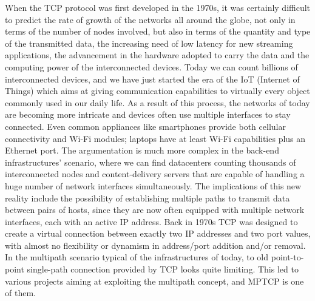 \vspace{5mm}
When the TCP protocol was first developed in the 1970s, it was certainly difficult to predict the rate of growth of the networks all around the globe, not only in terms of the number of nodes involved, but also in terms of the quantity and type of the transmitted data, the increasing need of low latency for new streaming applications, the advancement in the hardware adopted to carry the data and the computing power of the interconnected devices. Today we can count billions of interconnected devices, and we have just started the era of the IoT (Internet of Things) which aims at giving communication capabilities to virtually every object commonly used in our daily life.
As a result of this process, the networks of today are becoming more intricate and devices often use multiple interfaces to stay connected. Even common appliances like smartphones provide both cellular connectivity and Wi-Fi modules; laptops have at least Wi-Fi capabilities plus an Ethernet port. The argumentation is much more complex in the back-end infrastructures' scenario, where we can find datacenters counting thousands of interconnected nodes and content-delivery servers that are capable of handling a huge number of network interfaces simultaneously.
The implications of this new reality include the possibility of establishing multiple paths to transmit data between pairs of hosts, since they are now often equipped with multiple network interfaces, each with an active IP address. Back in 1970s TCP was designed to create a virtual connection between exactly two IP addresses and two port values, with almost no flexibility or dynamism in address/port addition and/or removal. In the multipath scenario typical of the infrastructures of today, to old point-to-point single-path connection provided by TCP looks quite limiting. This led to various projects aiming at exploiting the multipath concept, and MPTCP is one of them.

